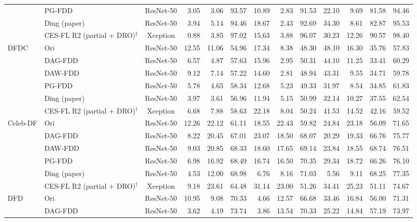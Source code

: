 \documentclass[9pt]{article}
\begin{document}
\begin{landscape}
\begin{longtable}{llc|rrr|rrr|rrr|r}
 & PG-FDD & ResNet-50 & 3.05 & 3.06 & 93.57 & 10.89 & 2.83 & 91.53 & 22.10 & 9.69 & 81.58 & 94.46\\
 & Ding (paper) & ResNet-50 & 3.94 & 5.14 & 94.46 & 18.67 & 2.43 & 92.69 & 34.30 & 8.61 & 82.87 & 95.53\\
\rowcolor{blue!8} & CES-FL R2 (partial + DRO)$^{\dagger}$ & Xception & 0.88 & 3.85 & 97.02 & 15.63 & 3.88 & 96.07 & 30.23 & 12.26 & 90.57 & 98.40\\
\midrule
\multirow{6}{*}{DFDC} & Ori & ResNet-50 & 12.55 & 11.06 & 54.96 & 17.34 & 8.38 & 48.30 & 48.10 & 16.30 & 35.76 & 57.83\\
 & DAG-FDD & ResNet-50 & 6.57 & 4.87 & 57.63 & 15.96 & 2.95 & 50.31 & 44.10 & 11.25 & 33.41 & 60.29\\
 & DAW-FDD & ResNet-50 & 9.12 & 7.14 & 57.22 & 14.60 & 2.81 & 48.94 & 43.31 & 9.55 & 34.71 & 59.78\\
 & PG-FDD & ResNet-50 & 5.78 & 4.65 & 58.34 & 12.68 & 5.23 & 49.33 & 31.97 & 8.54 & 34.85 & 61.83\\
 & Ding (paper) & ResNet-50 & 3.97 & 3.61 & 56.96 & 11.94 & 5.15 & 50.99 & 32.14 & 10.27 & 37.55 & 62.54\\
\rowcolor{blue!8} & CES-FL R2 (partial + DRO)$^{\dagger}$ & Xception & 6.68 & 7.88 & 58.63 & 22.18 & 8.04 & 50.24 & 41.53 & 14.52 & 42.16 & 59.52\\
\midrule
\multirow{6}{*}{Celeb-DF} & Ori & ResNet-50 & 12.26 & 22.12 & 61.11 & 18.55 & 22.43 & 59.82 & 24.84 & 23.18 & 56.09 & 71.65\\
 & DAG-FDD & ResNet-50 & 8.22 & 20.45 & 67.01 & 23.07 & 18.50 & 68.07 & 20.29 & 19.33 & 66.76 & 75.77\\
 & DAW-FDD & ResNet-50 & 9.03 & 20.85 & 68.33 & 18.60 & 17.65 & 69.14 & 23.84 & 18.55 & 68.74 & 76.51\\
 & PG-FDD & ResNet-50 & 6.98 & 16.92 & 68.49 & 16.74 & 16.50 & 70.35 & 29.34 & 18.72 & 66.26 & 76.10\\
 & Ding (paper) & ResNet-50 & 4.53 & 12.00 & 68.98 & 6.76 & 8.16 & 71.03 & 5.56 & 9.11 & 68.25 & 77.35\\
\rowcolor{blue!8} & CES-FL R2 (partial + DRO)$^{\dagger}$ & Xception & 9.18 & 23.61 & 64.48 & 31.14 & 23.00 & 51.26 & 34.41 & 25.23 & 51.11 & 74.67\\
\midrule
\multirow{6}{*}{DFD} & Ori & ResNet-50 & 10.95 & 9.08 & 70.33 & 4.66 & 12.57 & 66.68 & 33.46 & 16.84 & 56.00 & 71.31\\
 & DAG-FDD & ResNet-50 & 3.62 & 4.19 & 73.74 & 3.86 & 13.54 & 70.33 & 25.22 & 14.84 & 57.19 & 73.97\\

\end{longtable}
\end{landscape}
\end{document}
